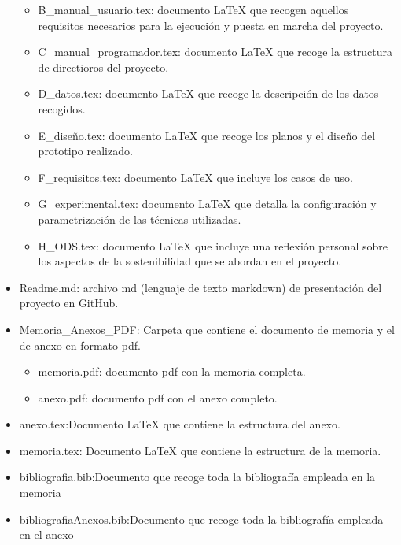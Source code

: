 \begin{itemize}
\begin{itemize}
        \item B\_manual\_usuario.tex: documento LaTeX que recogen aquellos requisitos necesarios para la ejecución y puesta en marcha del proyecto.
        \item C\_manual\_programador.tex: documento LaTeX que recoge la estructura de directioros del proyecto.
        \item D\_datos.tex: documento LaTeX que recoge la descripción de los datos recogidos.
        \item E\_diseño.tex: documento LaTeX que recoge los planos y el diseño del prototipo realizado.
        \item F\_requisitos.tex: documento LaTeX que incluye los casos de uso.
        \item G\_experimental.tex: documento LaTeX que detalla la configuración y parametrización de las técnicas utilizadas.
        \item H\_ODS.tex: documento LaTeX que incluye una reflexión personal sobre los aspectos de la sostenibilidad que se abordan en el proyecto.
    \end{itemize}
    \item Readme.md: archivo md (lenguaje de texto markdown) de presentación del proyecto en GitHub.
    \item Memoria\_Anexos\_PDF: Carpeta que contiene el documento de memoria y el de anexo en formato pdf.
    \begin{itemize}
        \item memoria.pdf: documento pdf con la memoria completa.
        \item anexo.pdf: documento pdf con el anexo completo.
    \end{itemize}
    \item anexo.tex:Documento LaTeX que contiene la estructura del anexo.
    \item memoria.tex: Documento LaTeX que contiene la estructura de la memoria.
    \item bibliografia.bib:Documento que recoge toda la bibliografía empleada en la memoria
    \item bibliografiaAnexos.bib:Documento que recoge toda la bibliografía empleada en el anexo
\end{itemize}
